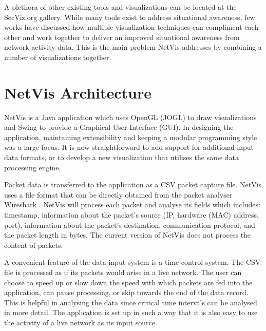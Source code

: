 A plethora of other existing tools and visualizations can be located at the SecViz.org gallery.
While many tools exist to address situational awareness, few works have discussed how multiple
visualization techniques can compliment each other and work together to deliver an improved
situational awareness from network activity data. This is the main problem NetVis addresses by
combining a number of visualizations together. 

\section{NetVis Architecture}\label{sec:overview}
%
NetVis is a Java application which uses OpenGL (JOGL) to draw visualizations and Swing to provide a
Graphical User Interface (GUI). In designing the application, maintaining extensibility and keeping
a modular programming style was a large focus. It is now straightforward to add support for
additional input data formats, or to develop a new visualization that utilises the same data
processing engine.

Packet data is transferred to the application as a CSV packet capture file. NetVis uses a file
format that can be directly obtained from the packet analyser Wireshark \cite{wireshark}. NetVis
will process each packet and analyse its fields which includes: timestamp, information about the
packet's source (IP, hardware (MAC) address, port), information about the packet's destination,
communication protocol, and the packet length in bytes. The current version of NetVis does not
process the content of packets. 


A convenient feature of the data input system is a time control system. The CSV file is processed as
if its packets would arise in a live network. The user can choose to speed up or slow down the
speed with which packets are fed into the application, can pause processing, or skip towards the end
of the data record. This is helpful in analysing the data since critical time intervals can be
analysed in more detail. The application is set up in such a way that it is also easy to use the
activity of a live network as its input source. 


